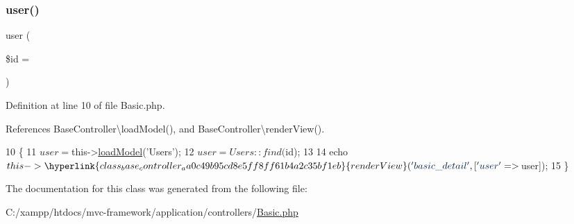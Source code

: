 \hypertarget{class_basic_a6603546e99f9519b86989be128736ad6}{}\label{class_basic_a6603546e99f9519b86989be128736ad6} 
\subsubsection{\texorpdfstring{user()}{user()}}
{\footnotesize\ttfamily user (\begin{DoxyParamCaption}\item[{}]{\$id = {\ttfamily \textquotesingle{}\textquotesingle{}} }\end{DoxyParamCaption})}



Definition at line 10 of file Basic.\+php.



References Base\+Controller\textbackslash{}load\+Model(), and Base\+Controller\textbackslash{}render\+View().


\begin{DoxyCode}
10                                    \{
11         $user = $this->\hyperlink{class_base_controller_a5fa8890bd3a9d20f5c0cc2377dc49eb1}{loadModel}(\textcolor{stringliteral}{'Users'});
12         $user = Users::find($id);
13 
14         echo $this->\hyperlink{class_base_controller_aa0c49b95cd8e5ff8ff61b4a2c35bf1eb}{renderView}(\textcolor{stringliteral}{'basic\_detail'}, [\textcolor{stringliteral}{'user'} => $user]);
15     \}
\end{DoxyCode}


The documentation for this class was generated from the following file\+:\begin{DoxyCompactItemize}
\item 
C\+:/xampp/htdocs/mvc-\/framework/application/controllers/\hyperlink{controllers_2_basic_8php}{Basic.\+php}\end{DoxyCompactItemize}

